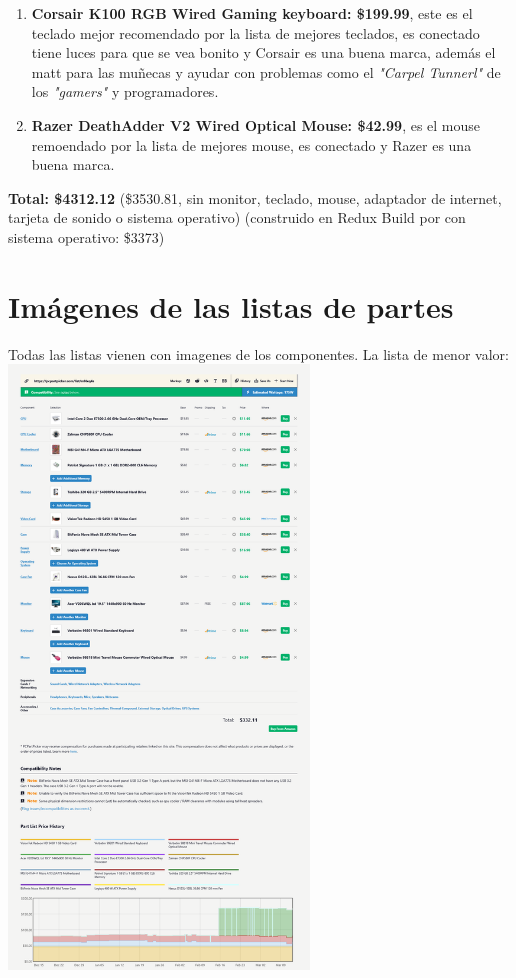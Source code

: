 \documentclass[12pt, a4paper]{article}
\begin{document}
\begin{enumerate}
    \item \textbf{Corsair K100 RGB Wired Gaming keyboard: \$199.99}, este es el teclado mejor recomendado por la lista de mejores teclados, es conectado tiene luces para que se vea bonito y Corsair es una buena marca, además el matt para las muñecas y ayudar con problemas como el \textit{"Carpel Tunnerl"} de los \textit{"gamers"} y programadores.
    \item \textbf{Razer DeathAdder V2 Wired Optical Mouse: \$42.99}, es el mouse remoendado por la lista de mejores mouse, es conectado y Razer es una buena marca.
\end{enumerate}
\textbf{Total: \$4312.12} (\$3530.81, sin monitor, teclado, mouse, adaptador de internet, tarjeta de sonido o sistema operativo) (construido en Redux Build por con sistema operativo: \$3373)
\section{Imágenes de las listas de partes}
\balance
Todas las listas vienen con imagenes de los componentes.
La lista de menor valor: \\
\includegraphics[width=0.6\textwidth]{Minimal.png} \\ \\ \\
\end{document}
